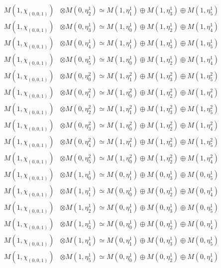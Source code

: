 \begin{align*}
M(1,\chi_{(0,0,1)}) &\otimes M(0,\eta^{1}_{2}) \simeq M(1,\eta^{1}_{1}) \oplus M(1,\eta^{1}_{3}) \oplus M(1,\eta^{1}_{5}) \\
M(1,\chi_{(0,0,1)}) &\otimes M(0,\eta^{1}_{3}) \simeq M(1,\eta^{1}_{0}) \oplus M(1,\eta^{1}_{2}) \oplus M(1,\eta^{1}_{4}) \\
M(1,\chi_{(0,0,1)}) &\otimes M(0,\eta^{1}_{4}) \simeq M(1,\eta^{1}_{1}) \oplus M(1,\eta^{1}_{3}) \oplus M(1,\eta^{1}_{5}) \\
M(1,\chi_{(0,0,1)}) &\otimes M(0,\eta^{1}_{5}) \simeq M(1,\eta^{1}_{0}) \oplus M(1,\eta^{1}_{2}) \oplus M(1,\eta^{1}_{4}) \\
M(1,\chi_{(0,0,1)}) &\otimes M(0,\eta^{2}_{0}) \simeq M(1,\eta^{2}_{1}) \oplus M(1,\eta^{2}_{3}) \oplus M(1,\eta^{2}_{5}) \\
M(1,\chi_{(0,0,1)}) &\otimes M(0,\eta^{2}_{1}) \simeq M(1,\eta^{2}_{0}) \oplus M(1,\eta^{2}_{2}) \oplus M(1,\eta^{2}_{4}) \\
M(1,\chi_{(0,0,1)}) &\otimes M(0,\eta^{2}_{2}) \simeq M(1,\eta^{2}_{1}) \oplus M(1,\eta^{2}_{3}) \oplus M(1,\eta^{2}_{5}) \\
M(1,\chi_{(0,0,1)}) &\otimes M(0,\eta^{2}_{3}) \simeq M(1,\eta^{2}_{0}) \oplus M(1,\eta^{2}_{2}) \oplus M(1,\eta^{2}_{4}) \\
M(1,\chi_{(0,0,1)}) &\otimes M(0,\eta^{2}_{4}) \simeq M(1,\eta^{2}_{1}) \oplus M(1,\eta^{2}_{3}) \oplus M(1,\eta^{2}_{5}) \\
M(1,\chi_{(0,0,1)}) &\otimes M(0,\eta^{2}_{5}) \simeq M(1,\eta^{2}_{0}) \oplus M(1,\eta^{2}_{2}) \oplus M(1,\eta^{2}_{4}) \\
M(1,\chi_{(0,0,1)}) &\otimes M(1,\eta^{1}_{0}) \simeq M(0,\eta^{1}_{1}) \oplus M(0,\eta^{1}_{3}) \oplus M(0,\eta^{1}_{5}) \\
M(1,\chi_{(0,0,1)}) &\otimes M(1,\eta^{1}_{1}) \simeq M(0,\eta^{1}_{0}) \oplus M(0,\eta^{1}_{2}) \oplus M(0,\eta^{1}_{4}) \\
M(1,\chi_{(0,0,1)}) &\otimes M(1,\eta^{1}_{2}) \simeq M(0,\eta^{1}_{1}) \oplus M(0,\eta^{1}_{3}) \oplus M(0,\eta^{1}_{5}) \\
M(1,\chi_{(0,0,1)}) &\otimes M(1,\eta^{1}_{3}) \simeq M(0,\eta^{1}_{0}) \oplus M(0,\eta^{1}_{2}) \oplus M(0,\eta^{1}_{4}) \\
M(1,\chi_{(0,0,1)}) &\otimes M(1,\eta^{1}_{4}) \simeq M(0,\eta^{1}_{1}) \oplus M(0,\eta^{1}_{3}) \oplus M(0,\eta^{1}_{5}) \\
M(1,\chi_{(0,0,1)}) &\otimes M(1,\eta^{1}_{5}) \simeq M(0,\eta^{1}_{0}) \oplus M(0,\eta^{1}_{2}) \oplus M(0,\eta^{1}_{4}) \\
\end{align*}

